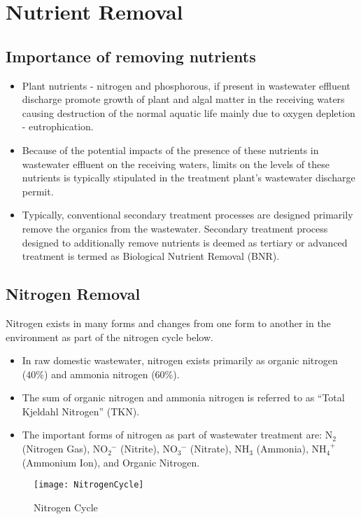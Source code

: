 \chapter{Nutrient Removal}

\section{Importance of removing nutrients}
\begin{itemize}
\item Plant nutrients - nitrogen and phosphorous, if present in wastewater effluent discharge promote growth of plant and algal matter in the receiving waters causing destruction of the normal aquatic life mainly due to oxygen depletion - eutrophication.

\item Because of the potential impacts of the presence of these nutrients in wastewater effluent on the receiving waters,  limits on the levels of these nutrients is typically stipulated in the treatment plant's wastewater discharge permit.

\item Typically, conventional secondary treatment processes are designed primarily remove the organics from the wastewater.  Secondary treatment process designed to additionally remove nutrients is deemed as tertiary or advanced treatment is termed as Biological Nutrient Removal (BNR).
\end{itemize}

\section{Nitrogen Removal}

Nitrogen exists in many forms and changes from one form to another in the environment as part of the nitrogen cycle below.

	\begin{itemize}
		\item In raw domestic wastewater, nitrogen exists primarily as organic nitrogen (40\%) and ammonia nitrogen (60\%). 
		\item The sum of organic nitrogen and ammonia nitrogen is referred to as “Total Kjeldahl Nitrogen” (TKN).  
		\item The important forms of nitrogen as part of wastewater treatment are: N$_2$ (Nitrogen Gas), NO$_2^{\enspace -}$ (Nitrite), NO$_3^{\enspace -}$ (Nitrate), NH$_3$ (Ammonia), NH$_4^{\enspace +}$ (Ammonium Ion), and Organic Nitrogen. 
	\end{itemize}
\begin{figure}[h]
	\begin{center}
	\texttt{[image: NitrogenCycle]}
	\caption{Nitrogen Cycle}
		\end{center}
\end{figure}

